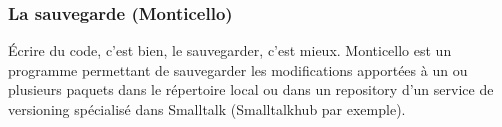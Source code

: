 \subsubsection{La sauvegarde (Monticello)}
Écrire du code, c'est bien, le sauvegarder, c'est mieux. Monticello est un programme permettant de sauvegarder les modifications apportées à un ou plusieurs paquets dans le répertoire local ou dans un repository d'un service de versioning spécialisé dans Smalltalk (Smalltalkhub par exemple).